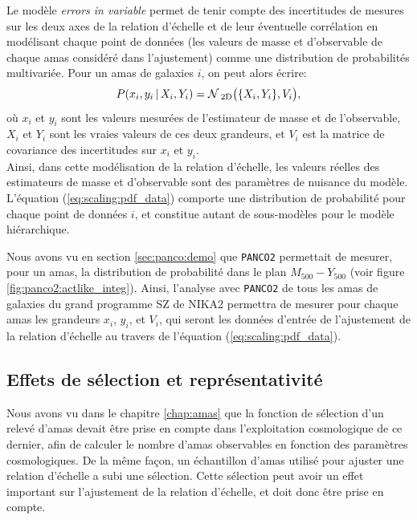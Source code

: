 Le modèle \textit{errors in variable} permet de tenir compte des incertitudes de mesures sur les deux axes de la relation d'échelle et de leur éventuelle corrélation en modélisant chaque point de données (les valeurs de masse et d'observable de chaque amas considéré dans l'ajustement) comme une distribution de probabilités multivariée.
Pour un amas de galaxies $i$, on peut alors écrire:
\begin{equation}
    \label{eq:scaling:pdf_data}
    P(x_i, y_i \,|\, X_i, Y_i) = \mathcal{N}\,_{\rm 2D}\big(\{X_i, Y_i\}, V_i\big),
\end{equation}
où $x_i$ et $y_i$ sont les valeurs mesurées de l'estimateur de masse et de l'observable, $X_i$ et $Y_i$ sont les vraies valeurs de ces deux grandeurs, et $V_i$ est la matrice de covariance des incertitudes sur $x_i$ et $y_i$. \\
Ainsi, dans cette modélisation de la relation d'échelle, les valeurs réelles des estimateurs de masse et d'observable sont des paramètres de nuisance du modèle.
L'équation (\ref{eq:scaling:pdf_data}) comporte une distribution de probabilité pour chaque point de données $i$, et constitue autant de sous-modèles pour le modèle hiérarchique.

Nous avons vu en section \ref{sec:panco:demo} que \texttt{PANCO2} permettait de mesurer, pour un amas, la distribution de probabilité dans le plan $M_{500}-Y_{500}$ (voir figure \ref{fig:panco2:actlike_integ}).
Ainsi, l'analyse avec \texttt{PANCO2} de tous les amas de galaxies du grand programme SZ de NIKA2 permettra de mesurer pour chaque amas les grandeurs $x_i$, $y_i$, et $V_i$, qui seront les données d'entrée de l'ajustement de la relation d'échelle au travers de l'équation (\ref{eq:scaling:pdf_data}).

\subsection{Effets de sélection et représentativité}

Nous avons vu dans le chapitre \ref{chap:amas} que la fonction de sélection d'un relevé d'amas devait être prise en compte dans l'exploitation cosmologique de ce dernier, afin de calculer le nombre d'amas observables en fonction des paramètres cosmologiques.
De la même façon, un échantillon d'amas utilisé pour ajuster une relation d'échelle a subi une sélection.
Cette sélection peut avoir un effet important sur l'ajustement de la relation d'échelle, et doit donc être prise en compte.

